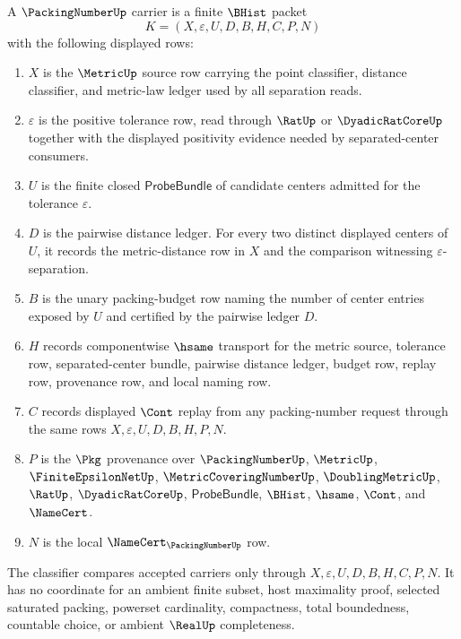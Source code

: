 \begin{definition}
\label{def:packing-number-carrier}
A $\PackingNumberUp$ carrier is a finite $\BHist$ packet
$$
K=(X,\varepsilon,U,D,B,H,C,P,N)
$$
with the following displayed rows:
\begin{enumerate}
\item $X$ is the $\MetricUp$ source row carrying the point classifier, distance classifier, and metric-law ledger used by all separation reads.
\item $\varepsilon$ is the positive tolerance row, read through $\RatUp$ or $\DyadicRatCoreUp$ together with the displayed positivity evidence needed by separated-center consumers.
\item $U$ is the finite closed $\mathsf{ProbeBundle}$ of candidate centers admitted for the tolerance $\varepsilon$.
\item $D$ is the pairwise distance ledger. For every two distinct displayed centers of $U$, it records the metric-distance row in $X$ and the comparison witnessing $\varepsilon$-separation.
\item $B$ is the unary packing-budget row naming the number of center entries exposed by $U$ and certified by the pairwise ledger $D$.
\item $H$ records componentwise $\hsame$ transport for the metric source, tolerance row, separated-center bundle, pairwise distance ledger, budget row, replay row, provenance row, and local naming row.
\item $C$ records displayed $\Cont$ replay from any packing-number request through the same rows $X,\varepsilon,U,D,B,H,P,N$.
\item $P$ is the $\Pkg$ provenance over $\PackingNumberUp$, $\MetricUp$, $\FiniteEpsilonNetUp$, $\MetricCoveringNumberUp$, $\DoublingMetricUp$, $\RatUp$, $\DyadicRatCoreUp$, $\mathsf{ProbeBundle}$, $\BHist$, $\hsame$, $\Cont$, and $\NameCert$.
\item $N$ is the local $\NameCert_{\PackingNumberUp}$ row.
\end{enumerate}
The classifier compares accepted carriers only through $X,\varepsilon,U,D,B,H,C,P,N$. It has no coordinate for an ambient finite subset, host maximality proof, selected saturated packing, powerset cardinality, compactness, total boundedness, countable choice, or ambient $\RealUp$ completeness.
\end{definition}


